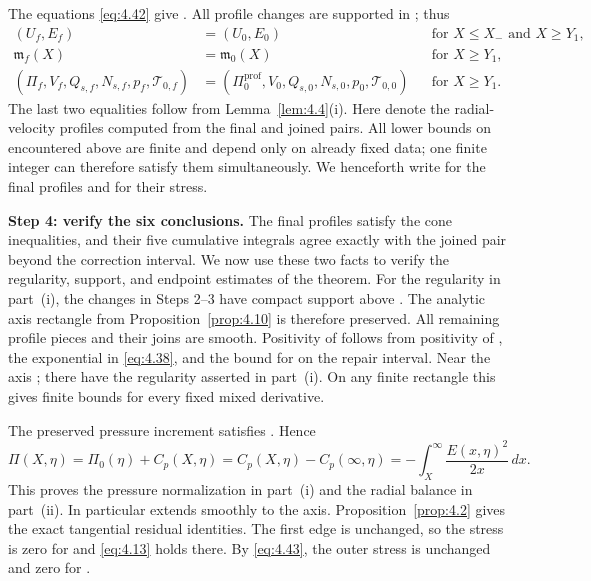 The equations \eqref{eq:4.42} give
. All profile changes are supported in
; thus
\begin{equation}
\label{eq:4.43}
\begin{aligned}
(U_f,E_f)&=(U_0,E_0) &&\text{for }X\le X_-\text{ and }X\ge Y_1,\\
\mathfrak m_f(X)&=\mathfrak m_0(X) &&\text{for }X\ge Y_1,\\
(\Pi_f,V_f,Q_{s,f},N_{s,f},p_f,\mathcal T_{0,f})
&=(\Pi_0^{\mathrm{prof}},V_0,Q_{s,0},N_{s,0},p_0,
\mathcal T_{0,0})
&&\text{for }X\ge Y_1.
\end{aligned}
\tag{4.43}
\end{equation}
The last two equalities follow from Lemma~\ref{lem:4.4}\textup{(i)}. Here
 denote the radial-velocity profiles
computed from the final and joined pairs. All lower bounds on
 encountered above are finite and depend only on already
fixed data; one finite integer can therefore satisfy them simultaneously. We
henceforth write  for the final profiles and
 for their stress.

\textbf{Step 4: verify the six conclusions.} The final profiles satisfy the cone
inequalities, and their five cumulative integrals agree exactly with the joined
pair beyond the correction interval. We now use these two facts to verify the
regularity, support, and endpoint estimates of the theorem. For the regularity
in part~\textup{(i)}, the changes in Steps 2--3 have compact support above
. The analytic axis rectangle from
Proposition~\ref{prop:4.10} is therefore preserved. All remaining profile
pieces and their joins are smooth. Positivity of 
follows from positivity of , the exponential in
\eqref{eq:4.38}, and the bound for  on the repair
interval. Near the axis
; there
 have the regularity asserted in
part~\textup{(i)}. On any finite rectangle this gives finite bounds for every
fixed mixed derivative.

The preserved pressure increment satisfies
. Hence
\[
\Pi(X,\eta)=\Pi_0(\eta)+C_p(X,\eta)
=C_p(X,\eta)-C_p(\infty,\eta)
=-\int_X^\infty\frac{E(x,\eta)^2}{2x}\,dx.
\]
This proves the pressure normalization in part~\textup{(i)} and the radial
balance in part~\textup{(ii)}. In particular
 extends smoothly to the axis.
Proposition~\ref{prop:4.2} gives the exact
%
tangential residual identities. The first edge is unchanged, so the stress is
zero for  and \eqref{eq:4.13} holds there. By
\eqref{eq:4.43}, the outer stress is unchanged and zero for
.

